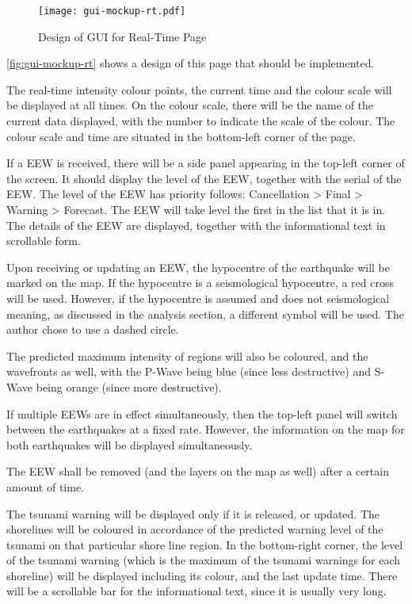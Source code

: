 \begin{figure}[htp]
    \centering
    \texttt{[image: gui-mockup-rt.pdf]}
    \caption{Design of GUI for Real-Time Page}
    \label{fig:gui-mockup-rt}
\end{figure}

\autoref{fig:gui-mockup-rt} shows a design of this page that should be implemented.

The real-time intensity colour points, the current time and the colour scale will be displayed at all times. On the colour scale, there will be the name of the current data displayed, with the number to indicate the scale of the colour. The colour scale and time are situated in the bottom-left corner of the page.

If a EEW is received, there will be a side panel appearing in the top-left corner of the screen. It should display the level of the EEW, together with the serial of the EEW. The level of the EEW has priority follows: Cancellation > Final > Warning > Forecast. The EEW will take level the first in the list that it is in. The details of the EEW are displayed, together with the informational text in scrollable form.

Upon receiving or updating an EEW, the hypocentre of the earthquake will be marked on the map. If the hypocentre is a seismological hypocentre, a red cross will be used. However, if the hypocentre is assumed and does not seismological meaning, as discussed in the analysis section, a different symbol will be used. The author chose to use a dashed circle.

The predicted maximum intensity of regions will also be coloured, and the wavefronts as well, with the P-Wave being blue (since less destructive) and S-Wave being orange (since more destructive).

If multiple EEWs are in effect simultaneously, then the top-left panel will switch between the earthquakes at a fixed rate. However, the information on the map for both earthquakes will be displayed simultaneously.

The EEW shall be removed (and the layers on the map as well) after a certain amount of time.

The tsunami warning will be displayed only if it is released, or updated. The shorelines will be coloured in accordance of the predicted warning level of the tsunami on that particular shore line region. In the bottom-right corner, the level of the tsunami warning (which is the maximum of the tsunami warnings for each shoreline) will be displayed including its colour, and the last update time. There will be a scrollable bar for the informational text, since it is usually very long.

